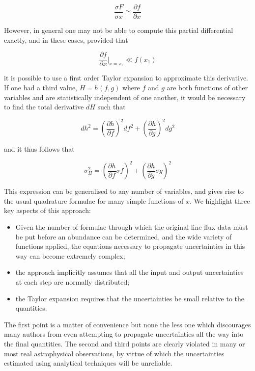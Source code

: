 \documentclass[useAMS,usenatbib]{mn2e}
\begin{document}
\begin{equation}
  \frac{\sigma F}{\sigma x} \simeq \frac{\partial f}{\partial x}
\end{equation}

However, in general one may not be able to compute this partial differential exactly, and in these cases, provided that

\begin{equation}
  \frac{\partial f}{\partial x}|_{x=x_1} \ll f(x_1)
\end{equation}

it is possible to use a first order Taylor expansion to approximate this derivative.  If one had a third value, $H = h(f, g)$ where $f$ and $g$ are both functions of other variables and are statistically independent of one another, it would be necessary to find the total derivative $dH$ such that

\begin{equation}
dh^2 = \left(\frac{\partial h}{\partial f}\right)^2df^2 + \left(\frac{\partial h}{\partial g}\right)^2dg^2
\end{equation}

and it thus follows that

\begin{equation}
\sigma^2_H = \left(\frac{\partial h}{\partial f}\sigma f\right)^2 + \left(\frac{\partial h}{\partial g}\sigma g\right)^2
\end{equation}

This expression can be generalised to any number of variables, and gives rise to the usual quadrature formulae for many simple functions of $x$.  We highlight three key aspects of this approach:

\begin{itemize}
  \item Given the number of formulae through which the original line flux data must be put before an abundance can be determined, and the wide variety of functions applied, the equations necessary to propagate uncertainties in this way can become extremely complex;
  \item the approach implicitly assumes that all the input and output uncertainties at each step are normally distributed;
  \item the Taylor expansion requires that the uncertainties be small relative to the quantities.
\end{itemize}

The first point is a matter of convenience but none the less one which discourages many authors from even attempting to propagate uncertainties all the way into the final quantities.  The second and third points are clearly violated in many or most real astrophysical observations, by virtue of which the uncertainties estimated using analytical techniques will be unreliable.
\end{document}
